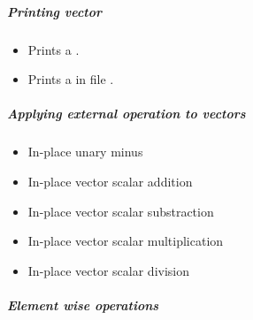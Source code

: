 \subparagraph{Printing vector}
\begin{itemize}
\item {}
  \sshortdescribe Prints a .  
\item {}
  \sshortdescribe Prints a  in file .  
\end{itemize}

\subparagraph{Applying external operation to vectors}

\begin{itemize}
\item {}
  \sshortdescribe In-place unary minus
\item {}
  \sshortdescribe In-place vector scalar addition  
\item {}
  \sshortdescribe In-place vector scalar substraction  
\item {}
  \sshortdescribe In-place vector scalar multiplication  
\item {}
  \sshortdescribe In-place vector scalar division  
\end{itemize}

\subparagraph{Element wise operations}

